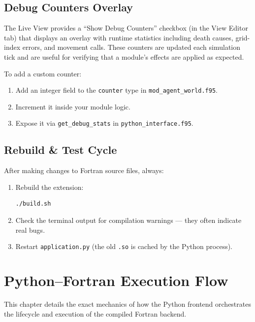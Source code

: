 \documentclass[14pt,a4paper]{extreport}
\begin{document}
\section{Debug Counters Overlay}
The Live View provides a ``Show Debug Counters'' checkbox (in the View Editor tab) that displays an overlay with runtime statistics including death causes, grid-index errors, and movement calls.
These counters are updated each simulation tick and are useful for verifying that a module's effects are applied as expected.

To add a custom counter:
\begin{enumerate}
    \item Add an integer field to the \texttt{counter} type in \texttt{mod\_agent\_world.f95}.
    \item Increment it inside your module logic.
    \item Expose it via \texttt{get\_debug\_stats} in \texttt{python\_interface.f95}.
\end{enumerate}

\section{Rebuild \& Test Cycle}
After making changes to Fortran source files, always:
\begin{enumerate}
    \item Rebuild the extension:
    \begin{lstlisting}[language=bash]
./build.sh
    \end{lstlisting}
    \item Check the terminal output for compilation warnings --- they often indicate real bugs.
    \item Restart \texttt{application.py} (the old \texttt{.so} is cached by the Python process).
\end{enumerate}

\chapter{Python--Fortran Execution Flow}
This chapter details the exact mechanics of how the Python frontend orchestrates the lifecycle and execution of the compiled Fortran backend.
\end{document}
